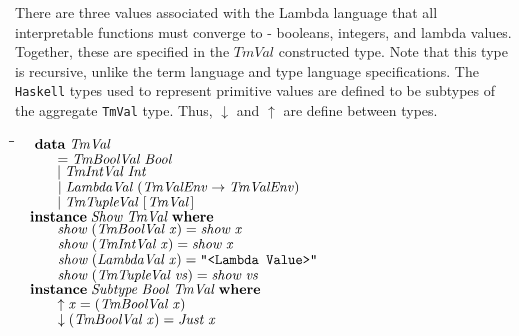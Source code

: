 \documentclass[10pt]{article}
\newlength{\lwidth}\setlength{\lwidth}{4.5cm}
\newlength{\cwidth}\setlength{\cwidth}{8mm} %
\newcommand{\Conid}[1]{\mathit{#1}}
\newcommand{\Varid}[1]{\mathit{#1}}
\begin{document}
There are three values associated with the Lambda language that all
interpretable functions must converge to - booleans, integers, and
lambda values.  Together, these are specified in the \ensuremath{\Conid{TmVal}}
constructed type.  Note that this type is recursive, unlike the term
language and type language specifications.  The \texttt{Haskell} types
used to represent primitive values are defined to be subtypes of the
aggregate \texttt{TmVal} type.  Thus, \ensuremath{\Varid{\downarrow}} and \ensuremath{\Varid{\uparrow}} are define
between types.

\begin{tabbing}
\qquad\=\hspace{\lwidth}\=\hspace{\cwidth}\=\+\kill
${\hskip1.00em\relax\mathbf{data}\;\Conid{TmVal}}$\\
${\hskip1.00em\relax\hskip2.00em\relax\mathrel{=}\Conid{TmBoolVal}\;\Conid{Bool}}$\\
${\hskip1.00em\relax\hskip2.00em\relax\mid \Conid{TmIntVal}\;\Conid{Int}}$\\
${\hskip1.00em\relax\hskip2.00em\relax\mid \Conid{LambdaVal}\;(\Conid{TmValEnv}\to \Conid{TmValEnv})}$\\
${\hskip1.00em\relax\hskip2.00em\relax\mid \Conid{TmTupleVal}\;[\mskip1.5mu \Conid{TmVal}\mskip1.5mu]}$\\
${}$\\
${\hskip1.00em\relax\mathbf{instance}\;\Conid{Show}\;\Conid{TmVal}\;\mathbf{where}}$\\
${\hskip1.00em\relax\hskip2.00em\relax\Varid{show}\;(\Conid{TmBoolVal}\;\Varid{x})\mathrel{=}\Varid{show}\;\Varid{x}}$\\
${\hskip1.00em\relax\hskip2.00em\relax\Varid{show}\;(\Conid{TmIntVal}\;\Varid{x})\mathrel{=}\Varid{show}\;\Varid{x}}$\\
${\hskip1.00em\relax\hskip2.00em\relax\Varid{show}\;(\Conid{LambdaVal}\;\Varid{x})\mathrel{=}\text{\tt \char34 <Lambda~Value>\char34}}$\\
${\hskip1.00em\relax\hskip2.00em\relax\Varid{show}\;(\Conid{TmTupleVal}\;\Varid{vs})\mathrel{=}\Varid{show}\;\Varid{vs}}$\\
${}$\\
${\hskip1.00em\relax\mathbf{instance}\;\Conid{Subtype}\;\Conid{Bool}\;\Conid{TmVal}\;\mathbf{where}}$\\
${\hskip1.00em\relax\hskip2.00em\relax\Varid{\uparrow}\;\Varid{x}\mathrel{=}(\Conid{TmBoolVal}\;\Varid{x})}$\\
${\hskip1.00em\relax\hskip2.00em\relax\Varid{\downarrow}\;(\Conid{TmBoolVal}\;\Varid{x})\mathrel{=}\Conid{Just}\;\Varid{x}}$\\

\end{tabbing}
\end{document}
